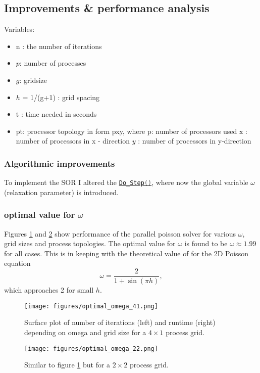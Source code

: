 \subsection{Improvements \& performance analysis}
Variables:
\begin{itemize}
    \item $\mathrm{n}$ : the number of iterations
    \item $p$: number of processes
    \item $g$: gridsize
    \item $h$ = 1/(g+1) : grid spacing
    \item $\mathrm{t}$ : time needed in seconds
    \item pt: processor topology in form pxy, where p: number of processors used $\mathrm{x}$ : number of processors in $\mathrm{x}$ - direction $y$ : number of processors in y-direction
\end{itemize}

\subsubsection{Algorithmic improvements}
To implement the SOR I altered the 
\href{https://github.com/PhilipSoliman/hpc-labs/blob/b16da8d7ee717657e13c316369fa0996da7816cc/assignment_1/ppoisson2.c#L576-L590}{\lstinline[language=C]|Do_Step()|},
where now the global variable $\omega$ (relaxation parameter) is introduced.

\subsubsection{optimal value for $\omega$}
Figures \ref{fig:optimal_omega_22} and \ref{fig:optimal_omega_41} show performance of the parallel poisson solver for 
various $\omega$, grid sizes and process topologies. 
The optimal value for $\omega$ is found to be $\omega\approx1.99$ for all cases. This is in keeping with the theoretical 
value of for the 2D Poisson equation \cite{Yang2009}
\[
    \omega = \frac{2}{1+\sin(\pi h)},
\]
which approaches 2 for small $h$.
\begin{figure}[H]
    \centering
    \texttt{[image: figures/optimal\_omega\_41.png]}
    \caption{Surface plot of number of iterations (left) and runtime (right) depending on omega and grid size for a $4\times1$ process grid.}
    \label{fig:optimal_omega_22}
\end{figure}

\begin{figure}[H]
    \centering
    \texttt{[image: figures/optimal\_omega\_22.png]}
    \caption{Similar to figure \ref{fig:optimal_omega_22} but for a $2\times2$ process grid.}
    \label{fig:optimal_omega_41}
\end{figure}

